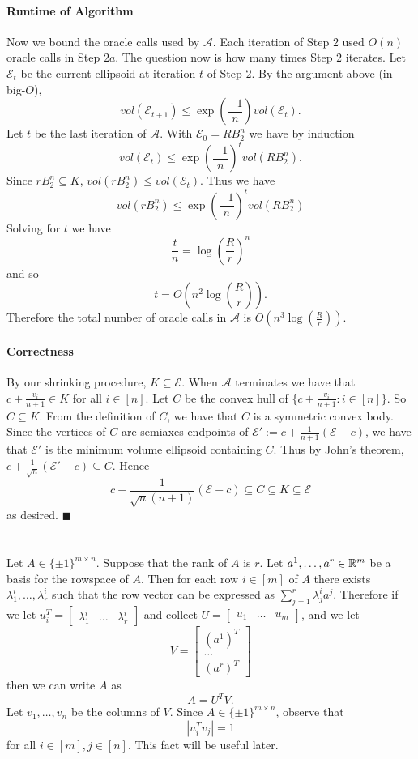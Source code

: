 \documentclass[letterpaper,12pt,oneside,onecolumn]{article}
\newcommand{\cA}{\mathcal{A}} \newcommand{\cB}{\mathcal{B}}
\newcommand{\cE}{\mathcal{E}} \newcommand{\cF}{\mathcal{F}}
\begin{document}
\paragraph{Runtime of Algorithm}
Now we bound the oracle calls used by $\cA$. Each iteration of Step $2$ used $O(n)$ oracle calls in Step $2a$. The question now is how many times Step $2$ iterates. Let $\cE_t$ be the current ellipsoid at iteration $t$ of Step $2$. By the argument above (in big-$O$),
$$vol(\cE_{t+1}) \leq \exp(\frac{-1}{n}) vol(\cE_t).$$
Let $t$ be the last iteration of $\cA$. With $\cE_0 = RB^n_2$ we have by induction
$$vol(\cE_t) \leq \exp(\frac{-1}{n})^t vol(RB^n_2).
$$Since $rB^n_2 \subseteq K$, $vol(rB^n_2) \leq vol(\cE_t)$. Thus we have
$$vol(rB^n_2) \leq \exp(\frac{-1}{n})^t vol(RB^n_2)$$
Solving for $t$ we have
$$\frac{t}{n} = \log(\frac{R}{r})^n$$
and so 
$$t = O(n^2\log(\frac{R}{r})).$$
Therefore the total number of oracle calls in $\cA$ is $O(n^3\log(\frac{R}{r}))$.
\paragraph{Correctness}
By our shrinking procedure, $K \subseteq \cE$. When $\cA$ terminates we have that
$c\pm \frac{v_i}{n+1} \in K$ for all $i \in [n]$. Let $C$ be the convex hull of $\{c\pm \frac{v_i}{n+1} : i \in [n]\}$. So $C \subseteq K$. From the definition of $C$, we have that $C$ is a symmetric convex body. Since the vertices of $C$ are semiaxes endpoints of $\cE' := c + \frac{1}{n+1}(\cE - c)$, we have that $\cE'$ is the minimum volume ellipsoid containing $C$. Thus by John's theorem, $c + \frac{1}{\sqrt{n}}(\cE'-c) \subseteq C$. Hence 
$$c + \frac{1}{\sqrt{n}(n+1)}(\cE  - c) \subseteq C \subseteq K \subseteq \cE$$
as desired. $\blacksquare$
\section{}
\paragraph{}
Let $A \in \{\pm 1\}^{m\times n}$. Suppose that the rank of $A$ is $r$. Let $a^1, \dots, a^r \in \mathbb{R}^m$ be a basis for the rowspace of $A$. Then for each row $i \in [m]$ of $A$ there exists $\lambda_1^i, \dots, \lambda^i_r$ such that the row vector can be expressed as $\sum_{j=1}^r \lambda_j^i a^j$. Therefore if we let $u_i^T = \begin{bmatrix} \lambda^i_1 &\dots &\lambda^i_r\end{bmatrix}$ and collect $U = \begin{bmatrix} u_1 &\dots & u_m \end{bmatrix}$, and we let $$V = \begin{bmatrix}
(a^1)^T \\ \dots \\ (a^r)^T
\end{bmatrix}$$ then we can write $A$ as 
$$A = U^T V.$$
Let $v_1, \dots, v_n$ be the columns of $V$. Since $A \in \{\pm 1\}^{m \times n}$, observe that $$|u^T_i v_j | = 1$$ for all $i \in [m], j \in [n]$. This fact will be useful later.
\end{document}
